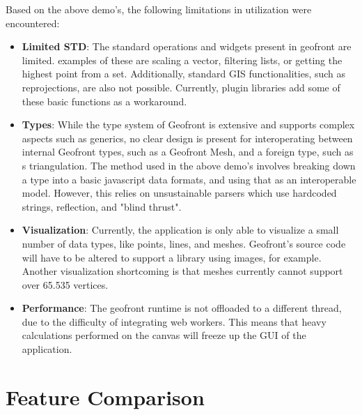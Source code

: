 Based on the above demo's, the following limitations in utilization were encountered: 
\begin{itemize}
  \item \textbf{Limited STD}: The standard operations and widgets present in geofront are limited. 
  examples of these are scaling a vector, filtering lists, or getting the highest point from a set.
  Additionally, standard \ac{GIS} functionalities, such as reprojections, are also not possible. 
  Currently, plugin libraries add some of these basic functions as a workaround.    

  \item \textbf{Types}: While the type system of Geofront is extensive and supports complex aspects such as generics, no clear design is present for interoperating between internal Geofront types, such as a Geofront Mesh, and a foreign type, such as s triangulation. 
  The method used in the above demo's involves breaking down a type into a basic javascript data formats, and using that as an interoperable model. 
  However, this relies on unsustainable parsers which use hardcoded strings, reflection, and "blind thrust".

  \item \textbf{Visualization}: Currently, the application is only able to visualize a small number of data types, like points, lines, and meshes. Geofront's source code will have to be altered to support a library using images, for example.
  Another visualization shortcoming is that meshes currently cannot support over 65.535 vertices. 
  
  \item \textbf{Performance}: The geofront runtime is not offloaded to a different thread, due to the difficulty of integrating web workers. 
  This means that heavy calculations performed on the canvas will freeze up the \ac{GUI} of the  application. 
 
\end{itemize} 


\section{Feature Comparison}
\label{sec:testing:features}

